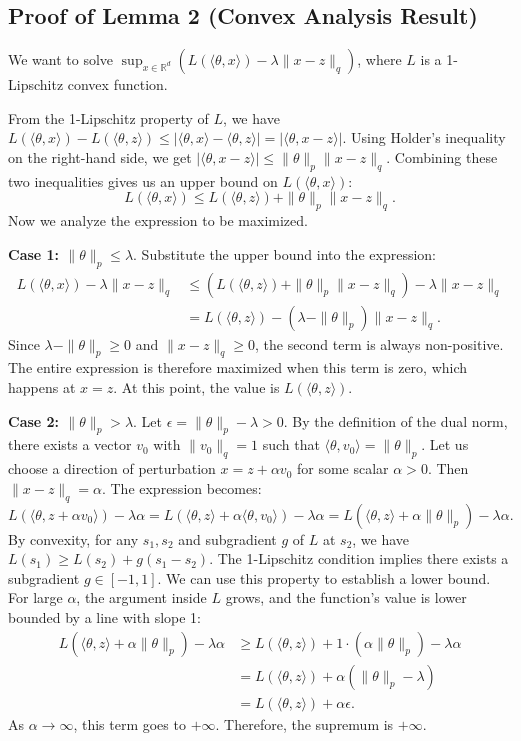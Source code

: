 \documentclass[12pt]{report}
\begin{document}
\begin{appendix}
\subsection{Proof of Lemma 2 (Convex Analysis Result)}\label{sec:lemma2}
We want to solve $\sup_{x \in \mathbb{R}^d} \left( L(\langle \theta, x \rangle) - \lambda \|x - z\|_q \right)$, where $L$ is a 1-Lipschitz convex function.

From the 1-Lipschitz property of $L$, we have $L(\langle \theta, x \rangle) - L(\langle \theta, z \rangle) \le |\langle \theta, x \rangle - \langle \theta, z \rangle| = |\langle \theta, x - z \rangle|$.
Using Holder's inequality on the right-hand side, we get $|\langle \theta, x - z \rangle| \le \|\theta\|_p \|x - z\|_q$.
Combining these two inequalities gives us an upper bound on $L(\langle \theta, x \rangle)$:
\[
L(\langle \theta, x \rangle) \le L(\langle \theta, z \rangle) + \|\theta\|_p \|x - z\|_q.
\]
Now we analyze the expression to be maximized.

\textbf{Case 1: $\|\theta\|_p \le \lambda$}.
Substitute the upper bound into the expression:
\begin{align*}
L(\langle \theta, x \rangle) - \lambda \|x - z\|_q &\le \left( L(\langle \theta, z \rangle) + \|\theta\|_p \|x - z\|_q \right) - \lambda \|x - z\|_q \\
&= L(\langle \theta, z \rangle) - (\lambda - \|\theta\|_p) \|x - z\|_q.
\end{align*}
Since $\lambda - \|\theta\|_p \ge 0$ and $\|x-z\|_q \ge 0$, the second term is always non-positive. 
The entire expression is therefore maximized when this term is zero, which happens at $x=z$. At this point, the value is $L(\langle \theta, z \rangle)$.

\textbf{Case 2: $\|\theta\|_p > \lambda$}.
Let $\epsilon = \|\theta\|_p - \lambda > 0$. By the definition of the dual norm, there exists a vector $v_0$ with $\|v_0\|_q=1$ such that $\langle \theta, v_0 \rangle = \|\theta\|_p$.
Let us choose a direction of perturbation $x = z + \alpha v_0$ for some scalar $\alpha > 0$. Then $\|x-z\|_q = \alpha$.
The expression becomes:
\[
L(\langle \theta, z + \alpha v_0 \rangle) - \lambda \alpha = L(\langle \theta, z \rangle + \alpha \langle \theta, v_0 \rangle) - \lambda \alpha = L(\langle \theta, z \rangle + \alpha \|\theta\|_p) - \lambda \alpha.
\]
By convexity, for any $s_1, s_2$ and subgradient $g$ of $L$ at $s_2$, we have $L(s_1) \ge L(s_2) + g(s_1-s_2)$. 
The 1-Lipschitz condition implies there exists a subgradient $g \in [-1, 1]$. We can use this property to establish a lower bound. 
For large $\alpha$, the argument inside $L$ grows, and the function's value is lower bounded by a line with slope 1:
\begin{align*}
L(\langle \theta, z \rangle + \alpha \|\theta\|_p) - \lambda \alpha &\ge L(\langle \theta, z \rangle) + 1 \cdot (\alpha \|\theta\|_p) - \lambda \alpha \\
&= L(\langle \theta, z \rangle) + \alpha (\|\theta\|_p - \lambda) \\
&= L(\langle \theta, z \rangle) + \alpha \epsilon.
\end{align*}
As $\alpha \to \infty$, this term goes to $+\infty$. Therefore, the supremum is $+\infty$.
\end{appendix}
\end{document}
